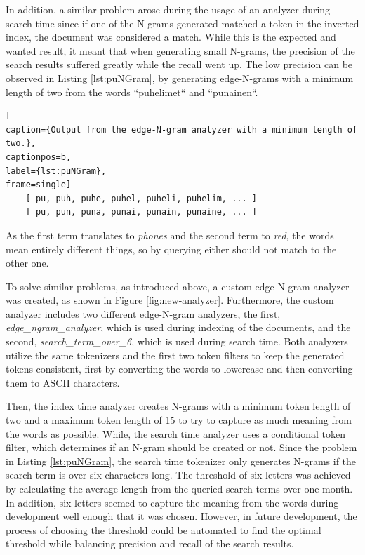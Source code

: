 In addition, a similar problem arose during the usage of an analyzer during search time since if one of the
N-grams generated matched a token in the inverted index, the document was considered a match.
While this is the expected and wanted result, it meant that when generating small N-grams, the precision
of the search results suffered greatly while the recall went up.
The low precision can be observed in Listing \ref{lst:puNGram}, by generating edge-N-grams with a minimum length of two from
the words ``puhelimet`` and ``punainen``.
\begin{lstlisting}[
caption={Output from the edge-N-gram analyzer with a minimum length of two.},
captionpos=b,
label={lst:puNGram},
frame=single]
    [ pu, puh, puhe, puhel, puheli, puhelim, ... ]
    [ pu, pun, puna, punai, punain, punaine, ... ]
\end{lstlisting}
As the first term translates to \emph{phones} and the second term to \emph{red}, the words mean entirely different things,
so by querying either should not match to the other one.


To solve similar problems, as introduced above, a custom edge-N-gram analyzer was created, 
as shown in Figure \ref{fig:new-analyzer}.
Furthermore, the custom analyzer includes two different edge-N-gram analyzers, the first, \emph{edge\_ngram\_analyzer},
which is used during indexing of the documents, and the second, \emph{search\_term\_over\_6}, which is used
during search time.
Both analyzers utilize the same tokenizers and the first two token filters to keep the generated tokens consistent,
first by converting the words to lowercase and then converting them to ASCII characters.


Then, the index time analyzer creates N-grams with a minimum token length of two and a maximum token length of 15 to try
to capture as much meaning from the words as possible.
While, the search time analyzer uses a conditional token filter, which determines if an N-gram should be created or not.
Since the problem in Listing \ref{lst:puNGram}, the search time tokenizer only generates N-grams if the 
search term is over six characters long.
The threshold of six letters was achieved by calculating the average length from the queried search terms over one month.
In addition, six letters seemed to capture the meaning from the words during development well enough that it was chosen.
However, in future development, the process of choosing the threshold could be automated to find the optimal threshold
while balancing precision and recall of the search results.

